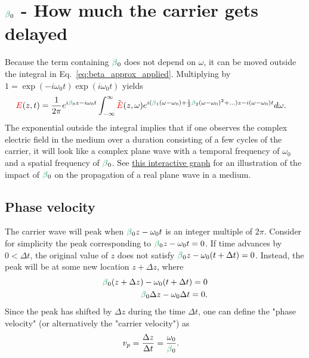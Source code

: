 \section{$\betag_0$ - How much the carrier gets delayed}
Because the term containing $\betag_0$ does not depend on $\omega$, it can be moved outside the integral in Eq.~\ref{eq:beta_approx_applied}. Multiplying by $1=\exp(-i\omega_0t)\exp(i\omega_0t)$ yields
\begin{align}
\label{eq:beta_approx_applied}
    \E(z,t) &= \frac{1}{2\pi} e^{i\betag_0z-i\omega_0t}  \int_{-\infty}^{\infty} \Tilde{\E}(z,\omega) e^{i(\betag_1(\omega-\omega_0)+\frac{1}{2}\betag_2(\omega-\omega_0)^2+...)z-i(\omega-\omega_0) t} d\omega.
\end{align}
The exponential outside the integral implies that if one observes the complex electric field in the medium over a duration consisting of a few cycles of the carrier, it will look like a complex plane wave with a temporal frequency of $\omega_0$ and a spatial frequency of $\betag_0$. See \href{https://www.desmos.com/calculator/ausd1wnl2j}{this interactive graph} for an illustration of the impact of $\betag_0$ on the propagation of a real plane wave in a medium. 

\subsection{Phase velocity}
\label{sec:Phase_velocity}
The carrier wave will peak when $\betag_0z-\omega_0t$ is an integer multiple of $2\pi$. Consider for simplicity the peak corresponding to $\betag_0z-\omega_0t=0$. If time advances by $0<\Delta t$, the original value of $z$ does not satisfy $\betag_0z-\omega_0(t+\Delta t)=0$. Instead, the peak will be at some new location $z+\Delta z$, where
\begin{align}
    \betag_0(z+\Delta z)-\omega_0(t+\Delta t)=0\\ \nonumber
    \betag_0\Delta z-\omega_0\Delta t=0.
\end{align}
Since the peak has shifted by $\Delta z$ during the time $\Delta t$, one can define the "phase velocity" (or alternatively the "carrier velocity") as
\begin{align}
\label{eq:Phase_velocity}
    v_p &= \frac{\Delta z}{\Delta t} = \frac{\omega_0}{\betag_0}.
\end{align}


